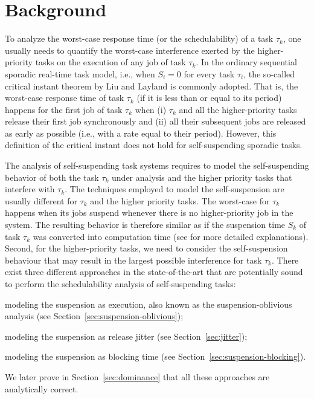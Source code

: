 \section{Background}
\label{sec:existing-analyses}

To analyze the worst-case response time (or the schedulability) of a task $\tau_k$, one usually needs to quantify the worst-case interference exerted by the higher-priority tasks on the execution of any job of task $\tau_k$. In the ordinary sequential sporadic real-time task model, i.e., when $S_i=0$ for every task $\tau_i$, the so-called critical instant theorem by Liu and Layland \cite{Liu_1973} is commonly adopted. That is, the worst-case response time of task $\tau_k$ (if it is less than or equal to its period) happens for the first job of task $\tau_k$ when (i) $\tau_k$ and all the higher-priority tasks release their first job synchronously and (ii) all their subsequent jobs are released as early as possible (i.e., with a rate equal to their period).  However,  this definition of the
critical instant does not hold for self-suspending sporadic tasks.  


The analysis of self-suspending task systems requires to model the self-suspending behavior of both the task $\tau_k$ under analysis and the higher priority tasks that interfere with $\tau_k$. The techniques employed to model the self-suspension are usually different for $\tau_k$ and the higher priority tasks. The worst-case for $\tau_k$ happens when its jobs suspend whenever there is no
higher-priority job in the system. The resulting behavior is therefore similar as if the
suspension time $S_k$ of task $\tau_k$ was converted
into computation time (see \cite{Huang_2015} for more detailed explanations). 
Second, for the higher-priority tasks,
we need to consider the self-suspension behaviour that may result in
the largest possible interference for task $\tau_k$.
There exist three different approaches in the state-of-the-art 
that are potentially sound to perform the schedulability analysis of self-suspending tasks:
\begin{compactitem}
\item modeling the suspension as execution, also known as the suspension-oblivious analysis (see Section~\ref{sec:suspension-oblivious});
\item modeling the suspension as release jitter (see Section~\ref{sec:jitter});
\item modeling the suspension as blocking time (see Section~\ref{sec:suspension-blocking}).
\end{compactitem}
We later prove in Section~\ref{sec:dominance} that all these approaches are analytically correct. 

